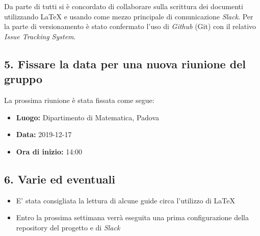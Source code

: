 Da parte di tutti si è concordato di collaborare sulla scrittura dei documenti utilizzando \LaTeX{} e usando come mezzo principale di comunicazione \textit{Slack}. Per la parte di versionamento è stato confermato l'uso di \textit{Github} (Git) con il relativo \textit{Issue Tracking System}.

\subsection*{5. Fissare la data per una nuova riunione del gruppo}

La prossima riunione è stata fissata come segue:
\begin{itemize}
	\item \textbf{Luogo:} Dipartimento di Matematica, Padova
	\item \textbf{Data:} 2019-12-17
	\item \textbf{Ora di inizio:} 14:00
\end{itemize}


\subsection*{6. Varie ed eventuali}

\begin{itemize}
	\item E' stata consigliata la lettura di alcune guide circa l'utilizzo di \LaTeX 
	\item Entro la prossima settimana verrà eseguita una prima configurazione della repository del progetto e di \textit{Slack}
\end{itemize}